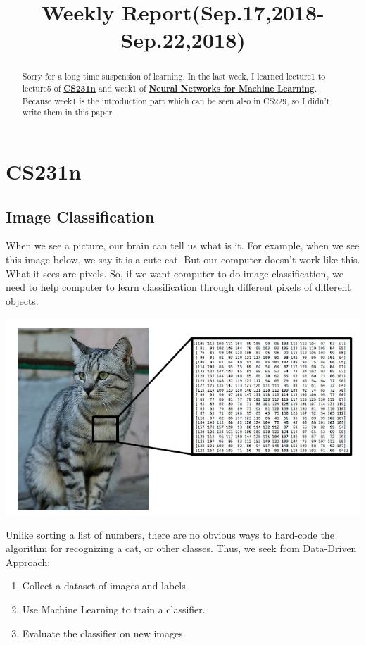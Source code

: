 \documentclass{article}
\title{Weekly Report(Sep.17,2018-Sep.22,2018)}
\begin{document}
\maketitle

\begin{abstract}
  Sorry for a long time suspension of learning. In the last week, I learned lecture1 to lecture5 of \textbf{\href{https://www.youtube.com/playlist?list=PL3FW7Lu3i5JvHM8ljYj-zLfQRF3EO8sYv}{CS231n}} and week1 of \textbf{\href{https://www.coursera.org/learn/neural-networks/home/welcome}{Neural Networks for Machine Learning}}. Because week1 is the introduction part which can be seen also in CS229, so I didn't write them in this paper.
\end{abstract}

\section{CS231n}
\subsection{Image Classification}
When we see a picture, our brain can tell us what is it. For example, when we see this image below, we say it is a cute cat. But our computer doesn't work like this. What it sees are pixels. So, if we want computer to do image classification, we need to help computer to learn classification through different pixels of different objects.
\begin{center}
\includegraphics[scale=0.8]{cat_.png}
\end{center}
Unlike sorting a list of numbers, there are no obvious ways to hard-code the algorithm for recognizing a cat, or other classes. Thus, we seek from Data-Driven Approach:
\begin{enumerate}
  \item Collect a dataset of images and labels.
  \item Use Machine Learning to train a classifier.
  \item Evaluate the classifier on new images.
\end{enumerate}
\end{document}
